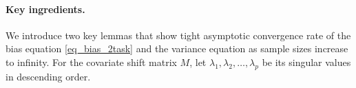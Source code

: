 
\paragraph{Key ingredients.}
We introduce two key lemmas that show tight asymptotic convergence rate of the bias equation \eqref{eq_bias_2task} and the variance equation  as sample sizes increase to infinity.
For the covariate shift matrix $M$, let $\lambda_1, \lambda_2, \dots, \lambda_p$ be its singular values in descending order.


